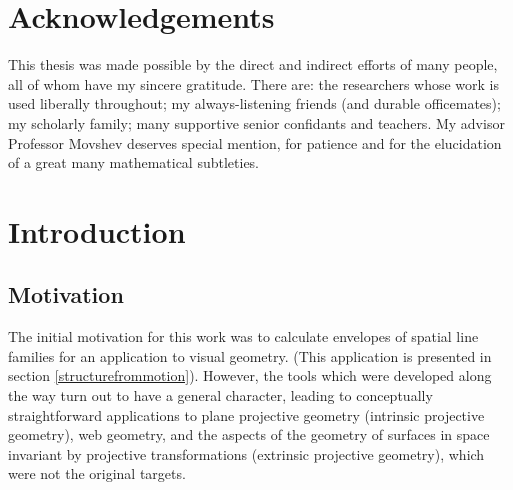 \documentclass[12pt]{article}
\numberwithin{equation}{section}
\theoremstyle{plain}
\theoremstyle{definition}
\begin{document}
\newpage

\tableofcontents


\newpage
{}

\section*{Acknowledgements}
This thesis was made possible by the direct and indirect efforts of many people, all of whom have my sincere gratitude. There are: the researchers whose work is used liberally throughout; my always-listening friends (and durable officemates); my scholarly family; many supportive senior confidants and teachers. My advisor Professor Movshev deserves special mention, for patience and for the elucidation of a great many mathematical subtleties.

\newpage

\section{Introduction}
\subsection{Motivation}
The initial motivation for this work was to calculate envelopes of spatial line families for an application to visual geometry. (This application is presented in section \ref{structurefrommotion}). However, the tools which were developed along the way turn out to have a general character, leading to conceptually straightforward applications to plane projective geometry (intrinsic projective geometry), web geometry, and the aspects of the geometry of surfaces in space invariant by projective transformations (extrinsic projective geometry), which were not the original targets.
\end{document}
